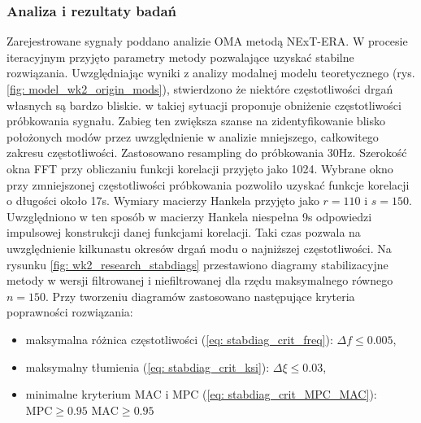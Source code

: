 \subsubsection{Analiza i rezultaty badań}
Zarejestrowane sygnały poddano analizie OMA metodą NExT-ERA. W procesie iteracyjnym przyjęto parametry metody pozwalające uzyskać stabilne rozwiązania. Uwzględniając wyniki z analizy modalnej modelu teoretycznego (rys. \ref{fig: model_wk2_origin_mods}), stwierdzono że niektóre częstotliwości drgań własnych są bardzo bliskie. \cite{Caicedo2011} w takiej sytuacji proponuje obniżenie częstotliwości próbkowania sygnału. Zabieg ten zwiększa szanse na zidentyfikowanie blisko położonych modów przez uwzględnienie w analizie mniejszego, całkowitego zakresu częstotliwości. Zastosowano resampling do próbkowania 30Hz. Szerokość okna FFT przy obliczaniu funkcji korelacji przyjęto jako 1024. Wybrane okno przy zmniejszonej częstotliwości próbkowania pozwoliło uzyskać funkcje korelacji o długości około 17s. Wymiary macierzy Hankela przyjęto jako $r=110$ i $s=150$. Uwzględniono w ten sposób w macierzy Hankela niespełna 9s odpowiedzi impulsowej konstrukcji danej funkcjami korelacji. Taki czas pozwala na uwzględnienie kilkunastu okresów drgań modu o najniższej częstotliwości. Na rysunku \ref{fig: wk2_research_stabdiags} przestawiono diagramy stabilizacyjne metody w wersji filtrowanej i niefiltrowanej dla rzędu maksymalnego równego $n=150$. Przy tworzeniu diagramów zastosowano następujące kryteria poprawności rozwiązania:
\begin{itemize}[noitemsep]
	\item maksymalna różnica częstotliwości (\ref{eq: stabdiag_crit_freq}): $\Delta f \le 0.005$,
	\item maksymalny tłumienia (\ref{eq: stabdiag_crit_ksi}): $\Delta \xi \le 0.03$,
	\item minimalne kryterium MAC i MPC (\ref{eq: stabdiag_crit_MPC_MAC}): $\text{MPC}\ge 0.95$ \quad$\text{MAC}\ge 0.95$
\end{itemize}


